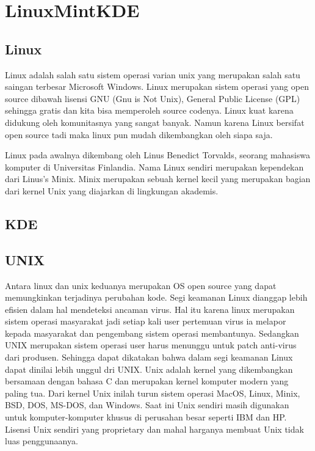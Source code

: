 \documentclass[11pt,fleqn]{book} %
\begin{document}
\newpage
{} %
\chapter{LinuxMintKDE}
\section{Linux}
\begin{flushleft}
\hspace{10pt}Linux adalah salah satu sistem operasi varian unix yang merupakan salah satu saingan terbesar Microsoft Windows. 
Linux merupakan sistem operasi yang open source dibawah lisensi GNU (Gnu is Not Unix), General Public License (GPL) sehingga gratis dan kita bisa memperoleh source codenya. 
Linux kuat karena didukung oleh komunitasnya yang sangat banyak.
Namun karena Linux bersifat open source tadi maka linux pun mudah dikembangkan oleh siapa saja.

\hspace{10pt}Linux pada awalnya dikembang oleh Linus Benedict Torvalds, seorang mahasiswa komputer di Universitas Finlandia.
Nama Linux sendiri merupakan kependekan dari Linus's Minix.
Minix merupakan sebuah kernel kecil yang merupakan bagian dari kernel Unix yang diajarkan di lingkungan akademis.
\end{flushleft}
\section{KDE}
\section{UNIX}
\begin{flushleft}
 \hspace{10pt} Antara linux dan unix keduanya merupakan OS open source yang dapat memungkinkan terjadinya perubahan kode.
 Segi keamanan Linux dianggap lebih efisien dalam hal mendeteksi ancaman virus. 
 Hal itu karena linux merupakan sistem operasi masyarakat jadi setiap kali user pertemuan virus ia melapor kepada masyarakat dan pengembang sistem operasi membantunya.
 Sedangkan UNIX merupakan sistem operasi user harus menunggu untuk patch anti-virus dari produsen.
 Sehingga dapat dikatakan bahwa dalam segi keamanan Linux dapat dinilai lebih unggul dri UNIX.
 Unix adalah kernel yang dikembangkan bersamaan dengan bahasa C dan merupakan kernel komputer modern yang paling tua.
 Dari kernel Unix inilah turun sistem operasi MacOS, Linux, Minix, BSD, DOS, MS-DOS, dan Windows.
 Saat ini Unix sendiri masih digunakan untuk komputer-komputer khusus di perusahan besar seperti IBM dan HP.
 Lisensi Unix sendiri yang proprietary dan mahal harganya membuat Unix tidak luas penggunaanya.
\end{flushleft}
\end{document}
